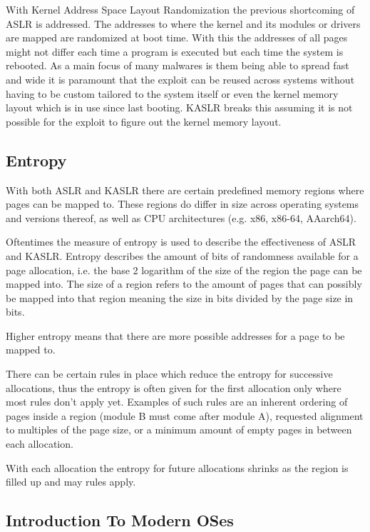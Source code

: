With Kernel Address Space Layout Randomization the previous shortcoming of ASLR is addressed.
The addresses to where the kernel and its modules or drivers are mapped are randomized at boot time.
With this the addresses of all pages might not differ each time a program is executed but each time the system is rebooted.
As a main focus of many malwares is them being able to spread fast and wide it is paramount that the exploit can be reused across systems without having to be custom tailored to the system itself or even the kernel memory layout which is in use since last booting.
KASLR breaks this assuming it is not possible for the exploit to figure out the kernel memory layout.

\subsection{Entropy}

With both ASLR and KASLR there are certain predefined memory regions where pages can be mapped to.
These regions do differ in size across operating systems and versions thereof, as well as CPU architectures (e.g. x86, x86-64, AAarch64).

Oftentimes the measure of entropy is used to describe the effectiveness of ASLR and KASLR.
Entropy describes the amount of bits of randomness available for a page allocation, i.e. the base 2 logarithm of the size of the region the page can be mapped into.
The size of a region refers to the amount of pages that can possibly be mapped into that region meaning the size in bits divided by the page size in bits.

Higher entropy means that there are more possible addresses for a page to be mapped to.

There can be certain rules in place which reduce the entropy for successive allocations,  thus the entropy is often given for the first allocation only where most rules don't apply yet.
Examples of such rules are an inherent ordering of pages inside a region (module B must come after module A), requested alignment to multiples of the page size, or a minimum amount of empty pages in between each allocation.

With each allocation the entropy for future allocations shrinks as the region is filled up and may rules apply.

\subsection{Introduction To Modern OSes}

